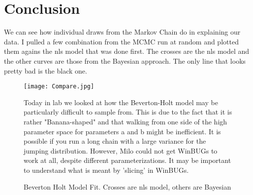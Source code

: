 \documentclass{article}
\begin{document}
\section{Conclusion}
We can see how individual draws from the Markov Chain do in explaining our data. I pulled a few combination from the MCMC run at random and plotted them agains the nls model that was done first. The crosses are the nls model and the other curves are those from the Bayesian approach. The only line that looks pretty bad is the black one. 

\begin{figure}[H]
    \centering
    \texttt{[image: Compare.jpg]}
    \caption{Beverton Holt Model Fit. Crosses are nls model, others are Bayesian}
    \label{Fig.3}
    
Today in lab we looked at how the Beverton-Holt model may be particularly difficult to sample from. This is due to the fact that it is rather "Banana-shaped" and that walking from one side of the high parameter space for parameters a and b might be inefficient. It is possible if you run a long chain with a large variance for the jumping distribution. However, Milo could not get WinBUGs to work at all, despite different parameterizations. It may be important to understand what is meant by 'slicing' in WinBUGs. 

\end{figure}
\end{document}
